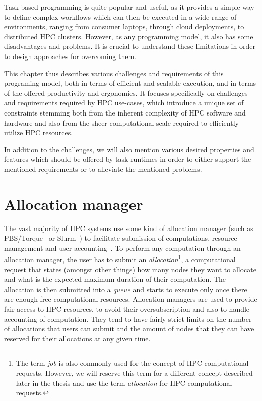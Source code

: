 Task-based programming is quite popular and useful, as it provides a simple way to define complex
workflows which can then be executed in a wide range of environments, ranging from consumer
laptops, through cloud deployments, to distributed HPC clusters. However, as any programming model,
it also has some disadvantages and problems. It is crucial to understand these limitations in order
to design approaches for overcoming them.

This chapter thus describes various challenges and requirements of this programing model, both in
terms of efficient and scalable execution, and in terms of the offered productivity and ergonomics.
It focuses specifically on challenges and requirements required by HPC use-cases, which introduce a
unique set of constraints stemming both from the inherent complexity of HPC software and hardware
and also from the sheer computational scale required to efficiently utilize HPC resources.

In addition to the challenges, we will also mention various desired properties and features which
should be offered by task runtimes in order to either support the mentioned requirements or to
alleviate the mentioned problems.


\section{Allocation manager}
The vast majority of HPC systems use some kind of allocation manager (such as
PBS\slash{}Torque~\cite{pbs} or Slurm~\cite{slurm}) to
facilitate submission of computations, resource management and user
accounting~\cite{slurm-schedmd}. To perform any computation through an allocation manager, the
user has to submit an \emph{allocation}\footnote{The term \emph{job} is also commonly used for the concept of HPC computational
requests. However, we will reserve this term for a different concept described later in the thesis and use the term
\emph{allocation} for HPC computational requests.}, a computational request
that states (amongst other things) how many nodes they want to allocate and what is the expected
maximum duration of their computation. The allocation is then submitted into a \emph{queue}
and starts to execute only once there are enough free computational resources. Allocation managers
are used to provide fair access to HPC resources, to avoid their oversubscription and also to
handle accounting of computation. They tend to have fairly strict limits on the number of
allocations that users can submit and the amount of nodes that they can have reserved for their
allocations at any given time.

